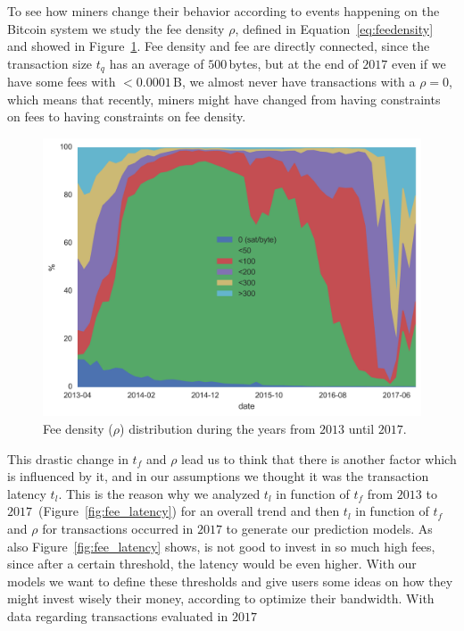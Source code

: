 \documentclass[USenglish]{uit-thesis}
\def\bitcoin{\leavevmode\rlap{\hskip.5pt-}B}
\begin{document}
To see how miners change their behavior according to
events happening on the Bitcoin system we study the fee density
$\rho$, defined in Equation~\ref{eq:feedensity} and showed in
Figure~\ref{fig:txs_feedensity_distribution}.
Fee density and fee are directly connected,
since the transaction size $t_q$ has an average of $500$\,bytes,
but at the end of $2017$ even if we have some fees with
$<0.0001$\,\bitcoin, we almost never
have transactions with a $\rho = 0$,
which means that recently, miners might have changed
from having constraints on fees to having constraints
on fee density.
\begin{figure}[h]
	\centering
	\includegraphics[width=1\textwidth]{img/txs_feedensity_distribution}
	\caption{Fee density ($\rho$) distribution during the years from
		$2013$ until $2017$.}
	\label{fig:txs_feedensity_distribution}
\end{figure}
This drastic change in $t_f$ and $\rho$
lead us to think that there is another factor which is
influenced by it, and in our assumptions we thought it
was the transaction latency $t_l$. This is the reason why
we analyzed $t_l$ in function of $t_f$ from $2013$ to
$2017$~(Figure~\ref{fig:fee_latency}) for an overall
trend and then $t_l$ in function of $t_f$ and $\rho$
for transactions occurred in $2017$ to generate our prediction
models. As also Figure~\ref{fig:fee_latency} shows, is not
good to invest in so much high fees, since after a certain
threshold, the latency would be even higher. With our
models we want to define these thresholds and give users
some ideas on how they might invest wisely their money,
according to optimize their bandwidth.
With data regarding transactions evaluated in $2017$
\end{document}
